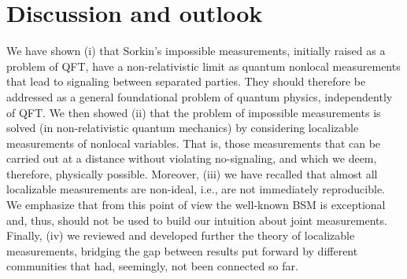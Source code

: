 \documentclass[a4paper,twocolumn,11pt,accepted=2024-02-14]{quantumarticle}
\begin{document}
\section{Discussion and outlook}
We have shown (i) that Sorkin's impossible measurements, initially raised as a problem of QFT, have a non-relativistic limit as quantum nonlocal measurements that lead to signaling between separated parties. They should therefore be addressed as a general foundational  problem of quantum physics, independently of QFT. We then showed (ii) that the problem of impossible measurements is solved (in non-relativistic quantum mechanics) by considering localizable measurements of nonlocal variables. That is, those measurements that can be carried out at a distance without violating no-signaling, and which we deem, therefore, physically possible. Moreover, (iii) we have recalled that almost all localizable measurements are non-ideal, i.e., are not immediately reproducible. We emphasize that from this point of view the well-known BSM is exceptional and, thus, should not be used to build our intuition about joint measurements. Finally, (iv) we reviewed and developed further the theory of localizable measurements, bridging the gap between results put forward by different communities that had, seemingly, not been connected so far. 
\end{document}
